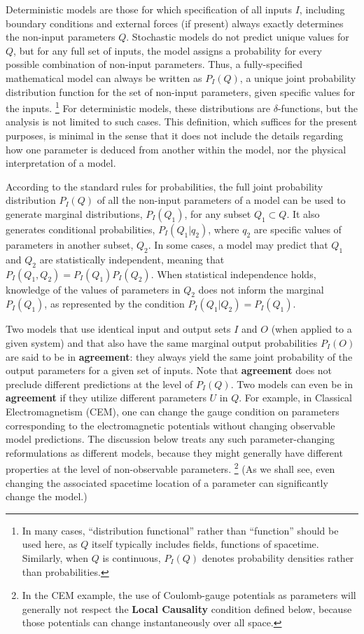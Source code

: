 \documentclass[rmp, aps, preprint, longbibliography]{revtex4-1}
\begin{document}
Deterministic models are those for which specification of all inputs $I$, including boundary conditions and external forces (if present) always exactly determines the non-input parameters $Q$.  Stochastic models do not predict unique values for $Q$, but for any full set of inputs, the model assigns a probability for every possible combination of non-input parameters.  Thus, a fully-specified mathematical model can always be written as $P_I(Q)$, a unique joint probability distribution function for the set of non-input parameters, given specific values for the inputs.%
\footnote{In many cases, ``distribution functional'' rather than ``function'' should be used here, as $Q$ itself typically includes fields, functions of spacetime.  Similarly, when $Q$ is continuous, $P_I(Q)$ denotes probability densities rather than probabilities.}
For deterministic models, these distributions are $\delta$-functions, but the analysis is not limited to such cases.  This definition, which suffices for the present purposes, is minimal in the sense that it does not include the details regarding how one parameter is deduced from another within the model, nor the physical interpretation of a model.
 
According to the standard rules for probabilities, the full joint probability distribution $P_I(Q)$ of all the non-input parameters of a model can be used to generate marginal distributions, $P_I(Q_1)$, for any subset $Q_1 \subset Q$.  It also generates conditional probabilities, $P_I(Q_1|q_2)$, where $q_2$ are specific values of parameters in another subset, $Q_2$.  In some cases, a model may predict that $Q_1$ and $Q_2$ are statistically independent, meaning that $P_I(Q_1,Q_2) = P_I(Q_1) P_I(Q_2)$.  When statistical independence holds, knowledge of the values of parameters in $Q_2$ does not inform the marginal $P_I(Q_1)$, as represented by the condition $P_{I}(Q_1|Q_2)=P_{I}(Q_1)$.

Two models that use identical input and output sets $I$ and $O$ (when applied to a given system) and that also have the same marginal output probabilities $P_I(O)$ are said to be in {\bf agreement}: they always yield the same joint probability of the output parameters for a given set of inputs.  Note that {\bf agreement} does not preclude different predictions at the level of $P_I(Q)$.  Two models can even be in {\bf agreement} if they utilize different parameters $U$ in $Q$.  For example, in Classical Electromagnetism (CEM), one can change the gauge condition on parameters corresponding to the electromagnetic potentials without changing observable model predictions.  The discussion below treats any such parameter-changing reformulations as different models, because they might generally have different properties at the level of non-observable parameters.%
\footnote{In the CEM example, the use of Coulomb-gauge potentials as parameters will generally not respect the {\bf Local Causality} condition defined below, because those potentials can change instantaneously over all space.}
(As we shall see, even changing the associated spacetime location of a parameter can significantly change the model.)
\end{document}
